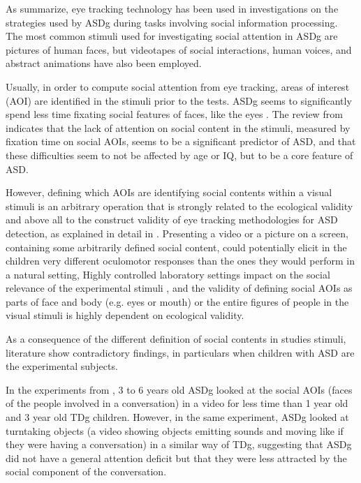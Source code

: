 As \cite{pensiero2009saccades} summarize, eye tracking technology has been used in investigations on the strategies used by ASDg during tasks involving social information processing. The most common stimuli used for investigating social attention in ASDg are pictures of human faces, but videotapes of social interactions, human voices, and abstract animations have also been employed.

Usually, in order to compute social attention from eye tracking, areas of interest (AOI) are identified in the stimuli prior to the tests. ASDg seems to significantly spend less time fixating social features of faces, like the eyes \citep{papagiannopoulou2014review, boraston2007eyetrackingASD}. The review from \cite{chitategmark2016socialattention} indicates that the lack of attention on social content in the stimuli, measured by fixation time on social AOIs, seems to be a significant predictor of ASD, and that these difficulties seem to not be affected by age or IQ, but to be a core feature of ASD.

However, defining which AOIs are identifying social contents within a visual stimuli is an arbitrary operation that is strongly related to the ecological validity and above all to the construct validity of eye tracking methodologies for ASD detection, as explained in detail in . Presenting a video or a picture on a screen, containing some arbitrarily defined social content, could potentially elicit in the children very different oculomotor responses than the ones they would perform in a natural setting, Highly controlled laboratory settings impact on the social relevance of the experimental stimuli \citep{papagiannopoulou2014review}, and the validity of defining social AOIs as parts of face and body (e.g. eyes or mouth) or the entire figures of people in the visual stimuli is highly dependent on ecological validity.

As a consequence of the different definition of social contents in studies stimuli, literature show contradictory findings, in particulars when children with ASD are the experimental subjects.

In the experiments from \cite{vonhofsten2009lookingevents}, 3 to 6 years old ASDg looked at the social AOIs (faces of the people involved in a conversation) in a video for less time than 1 year old and 3 year old TDg children. However, in the same experiment, ASDg looked at turntaking objects (a video showing objects emitting sounds and moving like if they were having a conversation) in a similar way of TDg, suggesting that ASDg did not have a general attention deficit but that they were less attracted by the social component of the conversation. 

